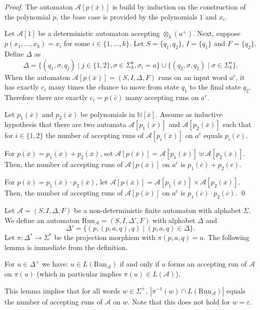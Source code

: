 \documentclass[envcountsame]{llncs}
\newcommand{\A}{\mathcal A}
\newcommand{\N}{\mathbb N}
\newcommand{\Run}{\mathrm{Run}}
\begin{document}
\begin{proof}
  The automaton $\A[p(\overline x)]$ is build by induction on the
  construction of the polynomial $p$, the base case is provided by the
  polynomials $1$ and $x_i$.

  Let $\A[1]$ be a deterministic automaton accepting $\otimes_k(a^+)$.
  Next, suppose $p(x_1,\ldots,x_k)=x_i$ for some $i\in \{1,\ldots,k\}$. Let
  $S=\{q_1,q_2\}$, $I=\{q_1\}$ and $F=\{q_2\}$. Define $\Delta$ as
  $$
  \Delta = \{ (q_1,\sigma,q_j) \mid j \in \{1,2\}, \sigma \in \Sigma_k^a,
  \sigma_i = a \} \cup \{ (q_2,\sigma,q_2) \mid  \sigma\in \Sigma_k^a\}.
  $$
  When the automaton $\A[p(\overline x)]=(S,I,\Delta,F)$ runs on an
  input word $a^{\overline c}$, it has exactly $c_i$ many times the
  chance to move from state $q_1$ to the final state $q_2$.  Therefore
  there are exactly $c_i=p(\overline c)$ many accepting runs on
  $a^{\overline c}$.

  Let $p_1(\overline x)$ and $p_2(\overline x)$ be polynomials in
  $\N[\overline{x}]$. Assume as inductive hypothesis that there are
  two automata $\A[p_1(\overline{x})]$ and
  $\A[p_2(\overline{x})]$ such that for $i\in
  \{1,2\}$ the number of accepting runs of $\A[p_i(\overline{x})]$ on
  $a^{\overline c}$ equals $p_i(\overline c)$.

  For $p(\overline x)=p_1(\overline x)+p_2(\overline x)$, set
  $\A[p(\overline{x})] = \A[p_1(\overline{x})] \uplus
  \A[p_2(\overline{x})]$.  Then, the number of accepting runs of
  $\A[p(\overline{x})]$ on $a^{\overline c}$ is $p_1(\overline
  c)+p_2(\overline c)$.

  For $p(\overline x)=p_1(\overline x)\cdot p_2(\overline x)$, let
  $\A[p(\overline{x})] = \A[p_1(\overline{x})] \times
  \A[p_2(\overline{x})]$.  Then, the number of accepting runs of
  $\A[p(\overline{x})]$ on $a^{\overline c}$ is $p_1(\overline c)
  \cdot p_2(\overline c)$.  \qed
\end{proof}

\noindent
Let $\A=(S,I,\Delta,F)$ be a non-deterministic finite automaton with
alphabet $\Sigma$. We define an automaton $\Run_\A=(S,I,\Delta',F)$
with alphabet $\Delta$ and
$$
\Delta' =  \{ (p, (p,a,q), q) \mid (p,a,q) \in \Delta \}.
$$
Let $\pi : \Delta^* \to \Sigma^*$ be the projection morphism with
$\pi(p,a,q) = a$.
The following lemma is immediate from the definition.

\begin{lemma}
  For $u \in \Delta^+$ we have: $u \in L(\Run_\A)$ if and only if $u$
  forms an accepting run of $\A$ on $\pi(u)$ (which in particular
  implies $\pi(u) \in L(\A)$).
\end{lemma}
This lemma implies that for all words $w\in \Sigma^+$, $|\pi^{-1}(w)
\cap L(\Run_\A)|$ equals the number of accepting runs of $\A$ on $w$.
Note that this does not hold for $w = \varepsilon$.
\end{document}
